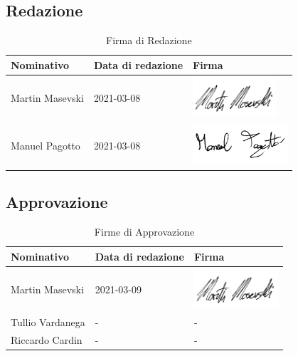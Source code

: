 \documentclass[../piano_di_progetto.tex]{subfiles}
\begin{document}
\subsection{Redazione}%
\label{sub:red}

\begin{table}[!ht]
	\centering
	\begin{tabular}{|l|l|l|}
		\hline
		\rowcolor{lightgray}
		\textbf{Nominativo} & \textbf{Data di redazione} & \textbf{Firma}\\ 
		\hline
			Martin Masevski & 2021-03-08 & \includegraphics[height=1.5cm]{src/img/firme/firma_mm.png} \\
			Manuel Pagotto & 2021-03-08 & \includegraphics[height=1.5cm]{src/img/firme/firma_mp.png} \\
		\hline
	\end{tabular}
	\caption{Firma di Redazione}
\end{table}


\subsection{Approvazione}%
\label{sub:app}

\begin{table}[!ht]
	\centering
	\begin{tabular}{|l|l|l|}
		\hline
		\rowcolor{lightgray}
		\textbf{Nominativo} & \textbf{Data di redazione} & \textbf{Firma} \\ 

		\hline
			Martin Masevski & 2021-03-09 & \includegraphics[height=1.5cm]{src/img/firme/firma_mm.png} \\ 
			Tullio Vardanega & - & - \\
			Riccardo Cardin  & - & - \\
		\hline
	\end{tabular}
		\caption{Firme di Approvazione}
\end{table}
\end{document}
